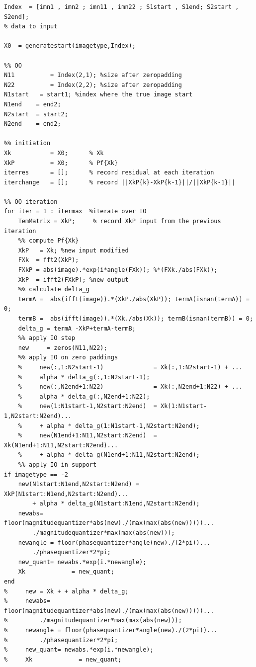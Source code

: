 \documentclass[letter,14pt]{extreport}
\begin{document}
\begin{appendices}
\begin{lstlisting}
Index  = [imn1 , imn2 ; imn11 , imn22 ; S1start , S1end; S2start , S2end];
% data to input

X0  = generatestart(imagetype,Index);

%% OO
N11          = Index(2,1); %size after zeropadding
N22          = Index(2,2); %size after zeropadding
N1start   = start1; %index where the true image start
N1end    = end2;
N2start  = start2;
N2end    = end2;

%% initiation
Xk           = X0;      % Xk
XkP          = X0;      % Pf{Xk}
iterres      = [];      % record residual at each iteration
iterchange   = [];      % record ||XkP{k}-XkP{k-1}||/||XkP{k-1}||

%% OO iteration
for iter = 1 : itermax  %iterate over IO
    TemMatrix = XkP;     % record XkP input from the previous iteration
    %% compute Pf{Xk}
    XkP   = Xk; %new input modified
    FXk  = fft2(XkP);
    FXkP = abs(image).*exp(i*angle(FXk)); %*(FXk./abs(FXk));
    XkP  = ifft2(FXkP); %new output
    %% calculate delta_g
    termA =  abs(ifft(image)).*(XkP./abs(XkP)); termA(isnan(termA)) = 0;
    termB =  abs(ifft(image)).*(Xk./abs(Xk)); termB(isnan(termB)) = 0;
    delta_g = termA -XkP+termA-termB;
    %% apply IO step
    new     = zeros(N11,N22);
    %% apply IO on zero paddings
    %     new(:,1:N2start-1)              = Xk(:,1:N2start-1) + ...
    %     alpha * delta_g(:,1:N2start-1);
    %     new(:,N2end+1:N22)              = Xk(:,N2end+1:N22) + ...
    %     alpha * delta_g(:,N2end+1:N22);
    %     new(1:N1start-1,N2start:N2end)  = Xk(1:N1start-1,N2start:N2end)...
    %     + alpha * delta_g(1:N1start-1,N2start:N2end);
    %     new(N1end+1:N11,N2start:N2end)  = Xk(N1end+1:N11,N2start:N2end)...
    %     + alpha * delta_g(N1end+1:N11,N2start:N2end);
    %% apply IO in support
if imagetype == -2
    new(N1start:N1end,N2start:N2end) = XkP(N1start:N1end,N2start:N2end)...
        + alpha * delta_g(N1start:N1end,N2start:N2end);
    newabs= floor(magnitudequantizer*abs(new)./(max(max(abs(new)))))...
        ./magnitudequantizer*max(max(abs(new)));
    newangle = floor(phasequantizer*angle(new)./(2*pi))...
        ./phasequantizer*2*pi;
    new_quant= newabs.*exp(i.*newangle);
    Xk             = new_quant;
end
%     new = Xk + + alpha * delta_g;
%     newabs= floor(magnitudequantizer*abs(new)./(max(max(abs(new)))))...
%         ./magnitudequantizer*max(max(abs(new)));
%     newangle = floor(phasequantizer*angle(new)./(2*pi))...
%         ./phasequantizer*2*pi;
%     new_quant= newabs.*exp(i.*newangle);
%     Xk             = new_quant;
    

\end{lstlisting}
\end{appendices}
\end{document}

